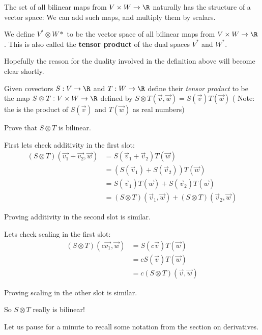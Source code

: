 \documentclass{ximera}
\begin{document}
	The set of all bilinear maps from $V \times W \to \R$ naturally has the structure of a vector space:  We can add such maps, and multiply them by scalars.
	\begin{definition}
		We define $V^* \otimes W*$ to be the vector space of all bilinear maps from $V \times W \to \R$.  This is also called the \textbf{tensor product} of the dual spaces
		$V^*$ and $W^*$.
	\end{definition}
	
		Hopefully the reason for the duality involved in the definition above will become clear shortly.
				
		Given covectors $S : V \to \R$ and $T:W \to \R$ define their \textit{tensor product} to be the map 
		$S \otimes T: V \times W \to \R$ defined by $S \otimes T(\vec{v},\vec{w}) = S(\vec{v}) T(\vec{w})$
		( Note: the is the product of $S(\vec{v})$ and $T(\vec{w})$  as real numbers)
		
		Prove that $S \otimes T$ is bilinear.
		
\begin{free-response}
	First lets check additivity in the first slot:
		\begin{align*}
			(S \otimes T)(\vec{v_1}+\vec{v_2},\vec{w}) &= S(\vec{v}_1+\vec{v}_2)T(\vec{w})\\
				&= \left(S(\vec{v}_1) +S(\vec{v}_2)\right)T(\vec{w})\\
				&=S(\vec{v}_1)T(\vec{w})+S(\vec{v}_2)T(\vec{w})\\
				&=(S\otimes T)(\vec{v}_1,\vec{w})+(S\otimes T)(\vec{v}_2,\vec{w})
		\end{align*}
		
		Proving additivity in the second slot is similar.
		
		Lets check scaling in the first slot:
		\begin{align*}
			(S \otimes T)(c\vec{v_1},\vec{w}) &= S(c\vec{v})T(\vec{w})\\
				&= cS(\vec{v})T(\vec{w})\\
				&=c(S\otimes T)(\vec{v},\vec{w})
		\end{align*}
		
		Proving scaling in the other slot is similar.
		
		So $S \otimes T$ really is bilinear!
		
\end{free-response}	

	Let us pause for a minute to recall some notation from the section on derivatives.
	
\end{document}
